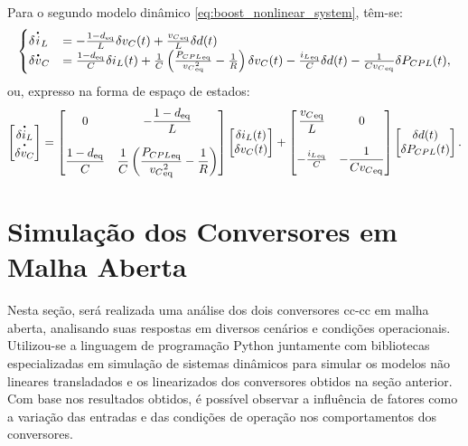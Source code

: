 Para o segundo modelo dinâmico \eqref{eq:boost_nonlinear_system}, têm-se: \begin{equation} \begin{cases} \delta \dt{i}_L &= - \frac{1 - d_{\text{eq}}}{L} \delta v_C(t) + \frac{{v_C}_{\text{eq}}}{L}\delta d(t) \\ \delta \dt{v}_C &= \frac{1 - d_{\text{eq}}}{C} \delta i_L(t) + \frac{1}{C} \left(\frac{{P_{CPL}}_{\text{eq}}}{{v_C}^2_{\text{eq}}} - \frac{1}{R}\right) \delta v_C(t) - \frac{{i_L}_{\text{eq}}}{C} \delta d(t) - \frac{1}{C{v_C}_{\text{eq}}} \delta P_{CPL}(t), \end{cases} \end{equation} ou, expresso na forma de espaço de estados: \begin{equation} \begin{bmatrix} \dt{\delta i_L} \\ \dt{\delta v_C} \end{bmatrix} = \begin{bmatrix} \displaystyle 0 & \displaystyle -\frac{1 - d_{\text{eq}}}{L}  \\\\ \displaystyle \frac{1 - d_{\text{eq}}}{C} & \displaystyle \frac{1}{C}\left(\frac{{P_{CPL}}_{\text{eq}}}{{{v_{C}}^2_{\text{eq}}}} - \frac{1}{R}\right) \end{bmatrix} \begin{bmatrix} \delta i_L(t) \\ \delta v_C(t) \end{bmatrix} + \begin{bmatrix} {\displaystyle \frac{{v_C}_{\text{eq}}}{L}} & 0 \\ \\ - \frac{{i_L}_{\text{eq}}}{C} & \displaystyle {-\frac{1}{C{v_C}_{\text{eq}}}} \end{bmatrix}  \begin{bmatrix} \delta d(t) \\ \delta P_{CPL}(t) \end{bmatrix}. \label{eq:boost_linear_system}\end{equation}

\section{Simulação dos Conversores em Malha Aberta}

Nesta seção, será realizada uma análise dos dois conversores \acrshort{cc}-\acrshort{cc} em malha aberta, analisando suas respostas em diversos cenários e condições operacionais. Utilizou-se a linguagem de programação Python juntamente com bibliotecas especializadas em simulação de sistemas dinâmicos para simular os modelos não lineares transladados e os linearizados dos conversores obtidos na seção anterior. Com base nos resultados obtidos, é possível observar a influência de fatores como a variação das entradas e das condições de operação nos comportamentos dos conversores.

